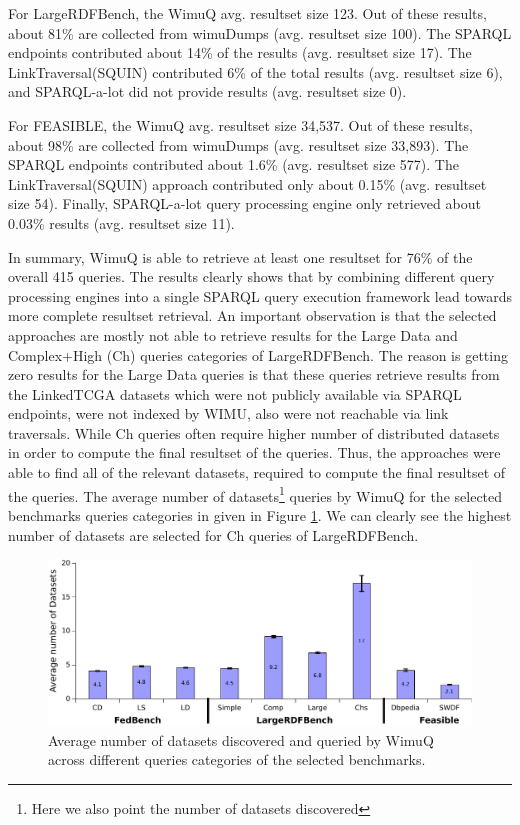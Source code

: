 For LargeRDFBench, the WimuQ avg. resultset size 123. Out of these results, about 81\% are collected from wimuDumps (avg. resultset size 100). The SPARQL endpoints contributed about 14\% of the results (avg. resultset size 17). The LinkTraversal(SQUIN) contributed 6\% of the total results (avg. resultset size 6), and SPARQL-a-lot did not provide results (avg. resultset size 0). 

For FEASIBLE, the WimuQ avg. resultset size 34,537. Out of these results, about 98\% are collected from wimuDumps (avg. resultset size 33,893). The SPARQL endpoints contributed about 1.6\% (avg. resultset size 577). The LinkTraversal(SQUIN) approach contributed only about 0.15\% (avg. resultset size 54). Finally, SPARQL-a-lot query processing engine only retrieved about 0.03\% results (avg. resultset size 11). 

In summary, WimuQ is able to retrieve at least one resultset for 76\% of the overall 415 queries. The results clearly shows that by combining different query processing engines into a single SPARQL query execution framework lead towards more complete resultset retrieval. 
An important observation is that the selected approaches are mostly not able to retrieve results for the Large Data and Complex+High (Ch) queries categories of LargeRDFBench. The reason is getting zero results for the Large Data queries is that these queries retrieve results from the LinkedTCGA \cite{tcga2013} datasets which were not publicly available via SPARQL endpoints, were not indexed by WIMU, also were not reachable via link traversals. While Ch queries often require higher number of distributed datasets in order to compute the final resultset of the queries. Thus, the approaches were able to find all of the relevant datasets, required to compute the final resultset of the queries. The average number of datasets\footnote{Here we also point the number of datasets discovered} queries by WimuQ for the selected benchmarks queries categories in given in Figure \ref{fig:numberDatasets1}. We can clearly see the highest number of datasets are selected for Ch queries of LargeRDFBench. 

\begin{figure}[htb]
\centering
    \includegraphics[width=\linewidth]{img/numberDatasets1.pdf}
	\caption{Average number of datasets discovered and queried by WimuQ across different queries categories of the selected benchmarks.}
	\label{fig:numberDatasets1}
\end{figure}

